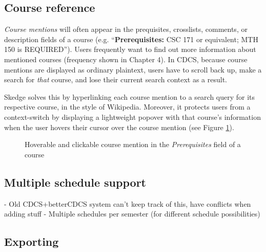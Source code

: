 \subsection{Course reference}

\emph{Course mentions} will often appear in the prequisites, crosslists, comments, or description fields of a course (e.g. ``\textbf{Prerequisites:} CSC 171 or equivalent; MTH 150 is REQUIRED''). Users frequently want to find out more information about mentioned courses (frequency shown in Chapter 4). In CDCS, because course mentions are displayed as ordinary plaintext, users have to scroll back up, make a search for \emph{that} course, and lose their current search context as a result.

Skedge solves this by hyperlinking each course mention to a search query for its respective course, in the style of Wikipedia. Moreover, it protects users from a context-switch by displaying a lightweight popover with that course's information when the user hovers their cursor over the course mention (see Figure \ref{fig:sk-hover}).

\begin{figure}[ht]
  \centering
  \vspace{10pt}
  \caption{Hoverable and clickable course mention in the \emph{Prerequisites} field of a course} \label{fig:sk-hover}
\end{figure}

\subsection{Multiple schedule support}

- Old CDCS+betterCDCS system can't keep track of this, have conflicts when adding stuff
- Multiple schedules per semester (for different schedule possibilities)

\subsection{Exporting}

